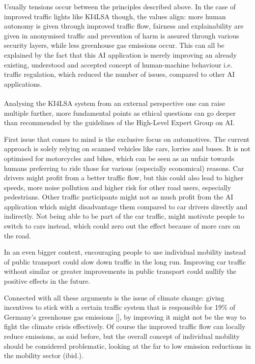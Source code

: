 Usually tensions occur between the principles described above. In the case of improved traffic lights like KI4LSA though, the values align: more human autonomy is given through improved traffic flow, fairness and explainability are given in anonymised traffic and prevention of harm is assured through various security layers, while less greenhouse gas emissions occur. This can all be explained by the fact that this AI application is merely improving an already existing, understood and accepted concept of human-machine behaviour i.e. traffic regulation, which reduced the number of issues, compared to other AI applications.\\

\\

Analysing the KI4LSA system from an external perspective one can raise multiple further, more fundamental points as ethical questions can go deeper than recommended by the guidelines of the High-Level Expert Group on AI.

First issue that comes to mind is the exclusive focus on automotives. The current approach is solely relying on scanned vehicles like cars, lorries and buses. It is not optimised for motorcycles and bikes, which can be seen as an unfair towards humans preferring to ride those for various (especially economical) reasons. Car drivers might profit from a better traffic flow, but this could also lead to higher speeds, more noise pollution and higher risk for other road users, especially pedestrians. Other traffic participants might not as much profit from the AI application which might disadvantage them compared to car drivers directly and indirectly. Not being able to be part of the car traffic, might motivate people to switch to cars instead, which could zero out the effect because of more cars on the road. 

In an even bigger context, encouraging people to use individual mobility instead of public transport could slow down traffic in the long run. Improving car traffic without similar or greater improvements in public transport could nullify the positive effects in the future.

Connected with all these arguments is the issue of climate change: giving incentives to stick with a certain traffic system that is responsible for 19\%
of Germany's greenhouse gas emissions [\citet{umweltbundesamt}], by improving it might not be the way to fight the climate crisis effectively. Of course the improved traffic flow can locally reduce emissions, as said before, but the overall concept of individual mobility should be considered problematic, looking at the far to low emission reductions in the mobility sector (ibid.). \\

